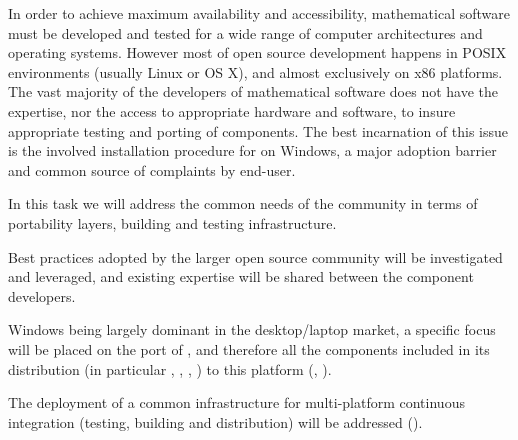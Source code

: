 \begin{workpackage}[id=component-architecture,wphases=0-48!.5,
  title=Component Architecture,lead=UV,
  PSRM=24,UVRM=8,SARM=16, USHRM=4, USORM=6]
  \begin{tasklist}
  \begin{task}[id=portability,title=Portability,lead=UV,PM=28]
    In order to achieve maximum availability and accessibility,
    mathematical software must be developed and tested for a wide range
    of computer architectures and operating systems.  However most of
    open source development happens in POSIX environments (usually
    Linux or OS X), and almost exclusively on x86 platforms.  The vast
    majority of the developers of mathematical software does not have
    the expertise, nor the access to appropriate hardware and software, to insure
    appropriate testing and porting of components.  The best
    incarnation of this issue is the involved installation procedure
    for \Sage on Windows, a major adoption barrier and common source of
    complaints by end-user.

    In this task we will address the common needs of the community in
    terms of portability layers, building and testing infrastructure.

    \begin{compactitem}
    \item Best practices adopted by the larger open source community
      will be investigated and leveraged, and existing expertise will
      be shared between the component developers.
    \item Windows being largely dominant in the desktop/laptop market,
      a specific focus will be placed on the port of \Sage, and
      therefore all the components included in its distribution (in
      particular \PariGP, \GAP, \Singular, \Linbox) to this platform
      (,
      ).
    \item The deployment of a common infrastructure for multi-platform
      continuous integration (testing, building and distribution) will
      be addressed
      ().
    \end{compactitem}


\end{task}
\end{tasklist}
\end{workpackage}
